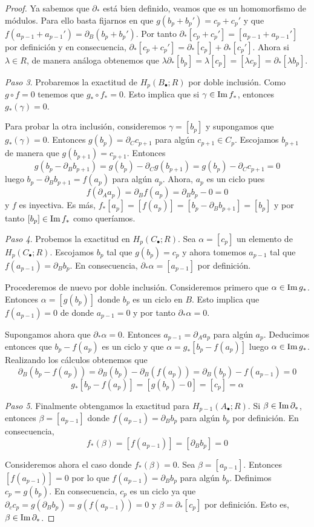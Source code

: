 \begin{proof}
	Ya sabemos que $\partial_*$ está bien definido, veamos que es un homomorfismo de módulos. Para ello basta fijarnos en que $g(b_p + b_p') = c_p + c_p'$ y que $f(a_{p-1}+ a_{p-1}') = \partial_B(b_p+ b_p')$. Por tanto $\partial_* [c_p + c_p'] = [a_{p-1} + a_{p-1}']$ por definición y en consecuencia, $\partial_* [c_p + c_p'] = \partial_*[c_{p}] + \partial_*[c_{p}']$. Ahora si $\lambda \in R$, de manera análoga obtenemos que $\lambda \partial_*[b_p] = \lambda [c_p] = [ \lambda c_p ] = \partial_* [ \lambda b_p ]$.
	
	\textit{Paso 3}. Probaremos la exactitud de $H_p(B_{\bullet};R)$ por doble inclusión. Como $g \circ f = 0$ tenemos que $g_* \circ f_* = 0$. Esto implica que si $\gamma \in \operatorname{Im} f_*$, entonces $g_*(\gamma) = 0$.
	
	Para probar la otra inclusión, consideremos $\gamma = [b_p]$ y supongamos que $g_*(\gamma) = 0$. Entonces $g(b_p) = \partial_C c_{p+1}$ para algún $c_{p+1} \in C_p$. Escojamos $b_{p+1}$ de manera que $g(b_{p+1}) = c_{p+1}$. Entonces
	\[
		g(b_p - \partial_B b_{p+1}) = g(b_p) - \partial_C g(b_{p+1}) = g(b_p) - \partial_C c_{p+1} = 0
	\]
	luego $b_p - \partial_B b_{p+1} = f(a_p)$ para algún $a_p$. Ahora, $a_p$ es un ciclo pues
	\[
		f(\partial_A a_p) = \partial_B f(a_p) = \partial_B b_p - 0 = 0 
	\] 
	y $f$ es inyectiva. Es más, $f_*[a_p] = [f(a_p)] = [b_p - \partial_B b_{p+1}] = [b_p]$ y por tanto $[b_p] \in \operatorname{Im} f_*$ como queríamos.
	
	\textit{Paso 4}. Probemos la exactitud en $H_p(C_{\bullet};R)$.  Sea $\alpha = [c_p]$ un elemento de $H_p(C_{\bullet};R)$. Escojamos $b_p$ tal que $g(b_p) = c_p$ y ahora tomemos $a_{p-1}$ tal que $f(a_{p-1}) = \partial_B b_p$. En consecuencia, $\partial_*\alpha = [a_{p-1}]$ por definición.
	
	Procederemos de nuevo por doble inclusión. Consideremos primero que $\alpha \in \operatorname{Im} g_*$. Entonces $\alpha = [g(b_p)]$ donde $b_p$ es un ciclo en $B$. Esto implica que $f(a_{p-1}) = 0$ de donde $a_{p-1} = 0$ y por tanto $\partial_* \alpha = 0$.
	
	Supongamos ahora que $\partial_* \alpha = 0$. Entonces $a_{p-1} = \partial_A a_p$ para algún $a_p$. Deducimos entonces que $b_p - f(a_p)$ es un ciclo y que $\alpha = g_*[b_p - f(a_p)]$ luego $\alpha \in \operatorname{Im} g_*$. Realizando los cálculos obtenemos que
	\[
		\partial_B(b_p - f(a_p)) = \partial_B(b_p) - \partial_B(f(a_p)) = \partial_B(b_p) - f(a_{p-1}) = 0
	\]
	\[
		g_*[b_p - f(a_p)] = [g(b_p) - 0] = [c_p] = \alpha
	\]
	
	\textit{Paso 5}. Finalmente obtengamos la exactitud para $H_{p-1}(A_{\bullet};R)$. Si $\beta \in \operatorname{Im} \partial_*$, entonces $\beta = [a_{p-1}]$ donde $f(a_{p-1}) = \partial_B b_p$ para algún $b_p$ por definición. En consecuencia,
	\[
		f_*(\beta) = [f(a_{p-1})] = [\partial_B b_p] = 0
	\]
	
	Consideremos ahora el caso donde $f_*(\beta) = 0$. Sea $\beta = [a_{p-1}]$. Entonces $[f(a_{p-1})] = 0$ por lo que $f(a_{p-1}) = \partial_B b_p$ para algún $b_p$. Definimos $c_p = g(b_p)$. En consecuencia, $c_p$ es un ciclo ya que $\partial_c c_p = g(\partial_B b_p) = g(f(a_{p-1})) = 0$ y $\beta = \partial_* [c_p]$ por definición. Esto es, $\beta \in \operatorname{Im} \partial_*$.
\end{proof}
